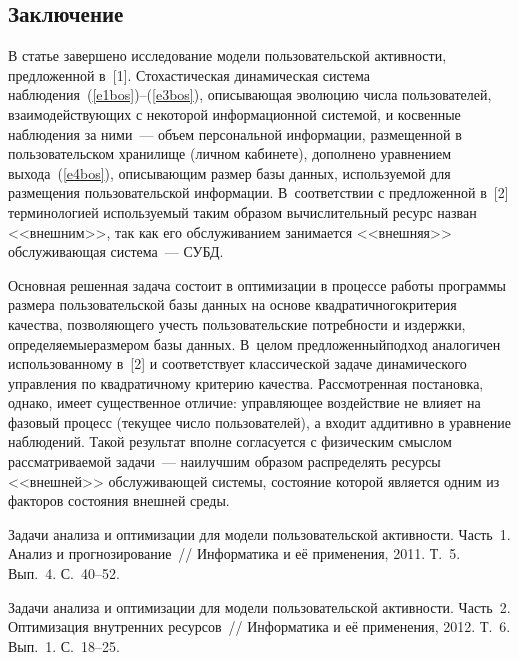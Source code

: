 \begin{multicols}{2}
\section{Заключение}
  
  В статье завершено исследование модели пользовательской активности, предложенной 
в~[1]. Стохастическая динамическая система наблюдения~(\ref{e1bos})--(\ref{e3bos}), 
описывающая эволюцию числа пользователей, взаимодействующих с некоторой 
информационной системой, и косвенные наблюдения за ними~--- объем персональной 
информации, размещенной в пользовательском хранилище (личном кабинете), дополнено 
уравнением выхода~(\ref{e4bos}), описывающим размер базы данных, используемой для 
размещения пользовательской информации. В~соответствии с предложенной в~[2] 
терминологией используемый таким образом вычислительный ресурс назван <<внешним>>, 
так как его обслуживанием занимается <<внешняя>> обслуживающая система~--- СУБД.
  
  Основная решенная задача состоит в оптимизации в процессе работы программы размера 
пользовательской базы данных на основе квадратичного\linebreak критерия качества, позволяющего 
учесть пользовательские потребности и издержки, опре\-де\-ля\-емые\linebreak размером базы данных. 
В~целом предложенный\linebreak подход аналогичен использованному в~[2] и соответствует 
классической задаче динамического управ\-ле\-ния по квадратичному критерию качества. 
Рассмотренная постановка, однако, имеет существенное отличие: управляющее воздействие 
не влияет на фазовый процесс (текущее число пользователей), а входит аддитивно в 
уравнение наблюдений. Такой результат вполне согласуется с физическим смыслом 
рассматриваемой задачи~--- наилучшим образом распределять ресурсы <<внешней>> 
обслуживающей системы, состояние которой является одним из факторов состояния 
внешней среды.

{\small\frenchspacing
{%
\begin{thebibliography}{9}

Задачи анализа и оптимизации для модели пользовательской активности. Часть~1. Анализ и 
прогнозирование~// Информатика и её применения, 2011. Т.~5. Вып.~4. С.~40--52.

Задачи анализа и оптимизации для модели пользовательской активности. Часть~2. 
Оптимизация внутренних ресурсов~// Информатика и её применения, 2012. Т.~6. Вып.~1. 
С.~18--25.


\end{thebibliography}}}
\end{multicols}
